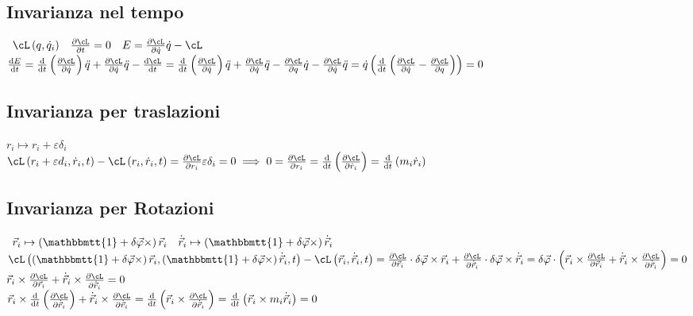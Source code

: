 \documentclass[a4paper,NoNotes,GeneralMath,12pt]{stdmdoc}
\begin{document}
	\subsection*{Invarianza nel tempo}
	$\begin{array}{ccc} \cL\left(q, \dot{q}_i\right) & \dpar{\cL}{t} = 0 & E = \dpar{\cL}{\dot{q}} \dot{q} - \cL \end{array}$ \\ $\de{E}{t} = \de{}{t}\left(\dpar{\cL}{\dot{q}}\right) \ddot{q} + \dpar{\cL}{\dot{q}} \ddot{q} - \de{\cL}{t} = \de{}{t}\left(\dpar{\cL}{\dot{q}}\right) \ddot{q} + \dpar{\cL}{\dot{q}} \ddot{q} - \dpar{\cL}{q} \dot{q} - \dpar{\cL}{\dot{q}} \ddot{q} = \dot{q} \left(\de{}{t} \left(\dpar{\cL}{\dot{q}} - \dpar{\cL}{q}\right)\right) = 0$

	\subsection*{Invarianza per traslazioni}
	$r_i \mapsto r_i + \varepsilon \delta_i$ \\ $\cL \left(r_i + \varepsilon d_i, \dot{r}_i, t\right) - \cL \left(r_i, \dot{r}_i, t\right) = \dpar{\cL}{r_i} \varepsilon \delta_i = 0 \implies 0 = \dpar{\cL}{r_i} = \de{}{t} \left(\dpar{\cL}{\dot{r}_i}\right) = \de{}{t} \left(m_i \dot{r}_i \right)$

	\subsection*{Invarianza per Rotazioni}
	$\begin{array}{cc} \vec{r}_i \mapsto \left(\mathbbmtt{1} + \delta \vec{\varphi}\times \right) \vec{r}_i & \dot{\vec{r}}_i \mapsto \left(\mathbbmtt{1} + \delta \vec{\varphi} \times\right) {\dot{\vec{r}}_i} \end{array}$ \\
	$\cL\left( \left(\mathbbmtt{1} + \delta \vec{\varphi} \times\right) \vec{r}_i, \left(\mathbbmtt{1} + \delta \vec{\varphi} \times\right) \dot{\vec{r}}_i, t\right) - \cL\left( \vec{r}_i, \dot{\vec{r}}_i, t\right) = \dpar{\cL}{\vec{r}_i} \cdot \delta \vec{\varphi}\times \vec{r}_i + \dpar{\cL}{\dot{\vec{r}}_i} \cdot \delta \vec{\varphi} \times \dot{\vec{r}}_i = \delta \vec{\varphi} \cdot \left( \vec{r}_i \times \dpar{\cL}{\vec{r}_i} + \dot{\vec{r}}_i \times \dpar{\cL}{\dot{\vec{r}}_i} \right) = 0$ \\
	$\vec{r}_i \times \dpar{\cL}{\vec{r}_i} + \dot{\vec{r}}_i \times \dpar{\cL}{\dot{\vec{r}}_i} = 0$ \\ $\vec{r}_i \times \de{}{t} \left( \dpar{\cL}{\dot{\vec{r}}_i} \right) + \dot{\vec{r}}_i \times \dpar{\cL}{\dot{\vec{r}}_i} = \de{}{t} \left( \vec{r}_i \times \dpar{\cL}{\dot{\vec{r}}_i} \right) = \de{}{t} \left( \vec{r}_i \times m_i \dot{\vec{r}}_i \right) = 0$
\end{document}
